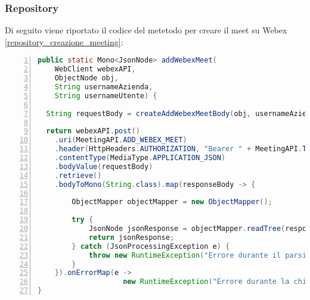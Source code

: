 \subsubsection{Repository}
Di seguito viene riportato il codice del metetodo per creare il meet su Webex \ref{repository_creazione_meeting}:
\begin{lstlisting}[language=java, frame=lines, basicstyle=\ttfamily\scriptsize, numbers=left,
    label={repository_creazione_meeting}, caption={repository creazione meeting - Webex}]
public static Mono<JsonNode> addWebexMeet(
    WebClient webexAPI, 
    ObjectNode obj, 
    String usernameAzienda,
    String usernameUtente) {

  String requestBody = createAddWebexMeetBody(obj, usernameAzienda, usernameUtente);

  return webexAPI.post()
    .uri(MeetingAPI.ADD_WEBEX_MEET)
    .header(HttpHeaders.AUTHORIZATION, "Bearer " + MeetingAPI.TOKEN)
    .contentType(MediaType.APPLICATION_JSON)
    .bodyValue(requestBody)
    .retrieve()
    .bodyToMono(String.class).map(responseBody -> {

        ObjectMapper objectMapper = new ObjectMapper();
            
        try {
            JsonNode jsonResponse = objectMapper.readTree(responseBody);
            return jsonResponse;
        } catch (JsonProcessingException e) {
            throw new RuntimeException("Errore durante il parsing della risposta JSON", e);
        }
    }).onErrorMap(e -> 
                    new RuntimeException("Errore durante la chiamata all'API di Webex", e));
}
\end{lstlisting}
